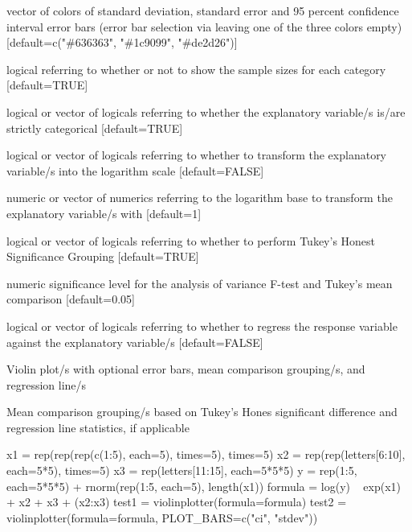 \documentclass[letterpaper]{book}
\begin{document}
\begin{Arguments}
\begin{ldescription}
\item[\code{ERROR\_BAR\_COLOURS}] vector of colors of standard deviation, standard error and 95 percent confidence interval error bars (error bar selection via leaving one of the three colors empty) [default=c("\#636363", "\#1c9099", "\#de2d26")]

\item[\code{SHOW\_SAMPLE\_SIZE}] logical referring to whether or not to show the sample sizes for each category [default=TRUE]

\item[\code{XCATEGOR}] logical or vector of logicals referring to whether the explanatory variable/s is/are strictly categorical [default=TRUE]

\item[\code{LOGX}] logical or vector of logicals referring to whether to transform the explanatory variable/s into the logarithm scale [default=FALSE]

\item[\code{LOGX\_BASE}] numeric or vector of numerics referring to the logarithm base to transform the explanatory variable/s with [default=1]

\item[\code{HSDX}] logical or vector of logicals referring to whether to perform Tukey's Honest Significance Grouping [default=TRUE]

\item[\code{ALPHA}] numeric significance level for the analysis of variance F-test and Tukey's mean comparison [default=0.05]

\item[\code{REGRESSX}] logical or vector of logicals referring to whether to regress the response variable against the explanatory variable/s [default=FALSE]
\end{ldescription}
\end{Arguments}
%
\begin{Value}
Violin plot/s with optional error bars, mean comparison grouping/s, and regression line/s

Mean comparison grouping/s based on Tukey's Hones significant difference and regression line statistics, if applicable
\end{Value}
%
\begin{Examples}
\begin{ExampleCode}
x1 = rep(rep(rep(c(1:5), each=5), times=5), times=5)
x2 = rep(rep(letters[6:10], each=5*5), times=5)
x3 = rep(letters[11:15], each=5*5*5)
y = rep(1:5, each=5*5*5) + rnorm(rep(1:5, each=5), length(x1))
formula = log(y) ~ exp(x1) + x2 + x3 + (x2:x3)
test1 = violinplotter(formula=formula)
test2 = violinplotter(formula=formula, PLOT_BARS=c("ci", "stdev"))

\end{ExampleCode}
\end{Examples}
\printindex{}
\end{document}
